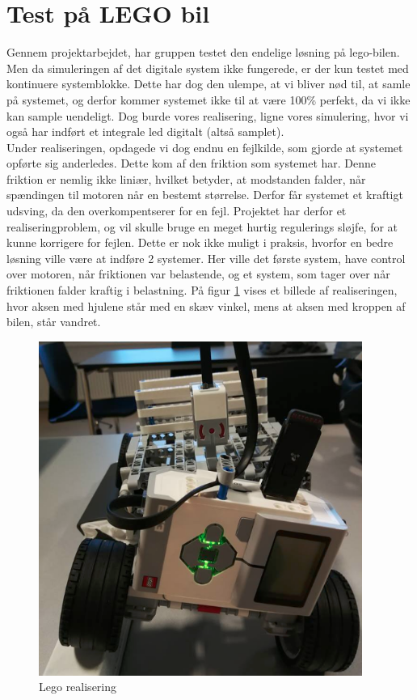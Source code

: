 \section{Test på LEGO bil}

Gennem projektarbejdet, har gruppen testet den endelige løsning på lego-bilen. Men da simuleringen af det digitale system ikke fungerede, er der kun testet med kontinuere systemblokke. Dette har dog den ulempe, at vi bliver nød til, at samle på systemet, og derfor kommer systemet ikke til at være 100\% perfekt, da vi ikke kan sample uendeligt. Dog burde vores realisering, ligne vores simulering, hvor vi også har indført et integrale led digitalt (altså samplet). \\
Under realiseringen, opdagede vi dog endnu en fejlkilde, som gjorde at systemet opførte sig anderledes. Dette kom af den friktion som systemet har. Denne friktion er nemlig ikke liniær, hvilket betyder, at modstanden falder, når spændingen til motoren når en bestemt størrelse. Derfor får systemet et kraftigt udsving, da den overkompentserer for en fejl. Projektet har derfor et realiseringproblem, og vil skulle bruge en meget hurtig regulerings sløjfe, for at kunne korrigere for fejlen. Dette er nok ikke muligt i praksis, hvorfor en bedre løsning ville være at indføre 2 systemer. Her ville det første system, have control over motoren, når friktionen var belastende, og et system, som tager over når friktionen falder kraftig i belastning. På figur \ref{fig:lego_bil} vises et billede af realiseringen, hvor aksen med hjulene står med en skæv vinkel, mens at aksen med kroppen af bilen, står vandret. 

\begin{figure}[H]
	\centering
	\includegraphics[width = 300pt]{figur/lego_bil}
	\caption{Lego realisering}
	\label{fig:lego_bil}
\end{figure}   